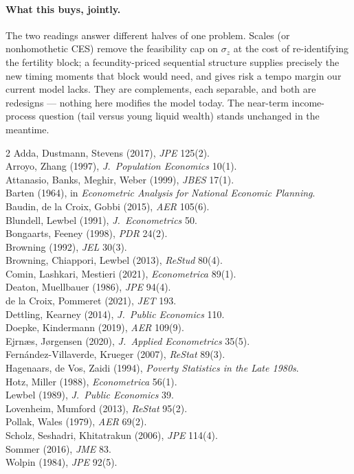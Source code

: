 \documentclass[10pt]{article}
\begin{document}
\paragraph{What this buys, jointly.}
The two readings answer different halves of one problem. Scales (or
nonhomothetic CES) remove the feasibility cap on $\sigma_z$ at the cost of
re-identifying the fertility block; a fecundity-priced sequential structure
supplies precisely the new timing moments that block would need, and gives
risk a tempo margin our current model lacks. They are complements, each
separable, and both are redesigns --- nothing here modifies the model today.
The near-term income-process question (tail versus young liquid wealth)
stands unchanged in the meantime.

\begin{footnotesize}
\begin{multicols}{2}
\noindent
Adda, Dustmann, Stevens (2017), \emph{JPE} 125(2).\\
Arroyo, Zhang (1997), \emph{J.\ Population Economics} 10(1).\\
Attanasio, Banks, Meghir, Weber (1999), \emph{JBES} 17(1).\\
Barten (1964), in \emph{Econometric Analysis for National Economic Planning}.\\
Baudin, de la Croix, Gobbi (2015), \emph{AER} 105(6).\\
Blundell, Lewbel (1991), \emph{J.\ Econometrics} 50.\\
Bongaarts, Feeney (1998), \emph{PDR} 24(2).\\
Browning (1992), \emph{JEL} 30(3).\\
Browning, Chiappori, Lewbel (2013), \emph{ReStud} 80(4).\\
Comin, Lashkari, Mestieri (2021), \emph{Econometrica} 89(1).\\
Deaton, Muellbauer (1986), \emph{JPE} 94(4).\\
de la Croix, Pommeret (2021), \emph{JET} 193.\\
Dettling, Kearney (2014), \emph{J.\ Public Economics} 110.\\
Doepke, Kindermann (2019), \emph{AER} 109(9).\\
Ejrn\ae s, J\o rgensen (2020), \emph{J.\ Applied Econometrics} 35(5).\\
Fern\'andez-Villaverde, Krueger (2007), \emph{ReStat} 89(3).\\
Hagenaars, de Vos, Zaidi (1994), \emph{Poverty Statistics in the Late 1980s}.\\
Hotz, Miller (1988), \emph{Econometrica} 56(1).\\
Lewbel (1989), \emph{J.\ Public Economics} 39.\\
Lovenheim, Mumford (2013), \emph{ReStat} 95(2).\\
Pollak, Wales (1979), \emph{AER} 69(2).\\
Scholz, Seshadri, Khitatrakun (2006), \emph{JPE} 114(4).\\
Sommer (2016), \emph{JME} 83.\\
Wolpin (1984), \emph{JPE} 92(5).
\end{multicols}
\end{footnotesize}
\end{document}
